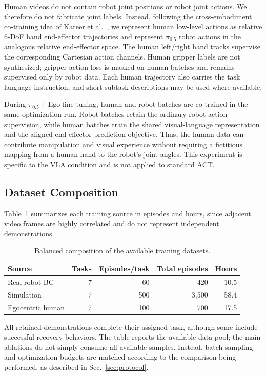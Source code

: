 \documentclass[10pt,conference]{IEEEtran}
\begin{document}
Human videos do not contain robot joint positions or robot joint actions. We
therefore do not fabricate joint labels. Instead, following the cross-embodiment
co-training idea of Kareer et al.~\cite{kareer2025humanrobot}, we represent
human low-level actions as relative 6-DoF hand end-effector trajectories and
represent $\pi_{0.5}$ robot actions in the analogous relative end-effector
space. The human left/right hand tracks supervise the corresponding Cartesian
action channels. Human gripper labels are not synthesized; gripper-action loss
is masked on human batches and remains supervised only by robot data. Each
human trajectory also carries the task language instruction, and short subtask
descriptions may be used where available.

During $\pi_{0.5}+\mathrm{Ego}$ fine-tuning, human and robot batches are
co-trained in the same optimization run. Robot batches retain the ordinary
robot action supervision, while human batches train the shared visual-language
representation and the aligned end-effector prediction objective. Thus, the
human data can contribute manipulation and visual experience without requiring
a fictitious mapping from a human hand to the robot's joint angles. This experiment
is specific to the VLA condition and is not applied to standard ACT.

\subsection{Dataset Composition}

Table~\ref{tab:data} summarizes each training source in episodes and hours,
since adjacent video frames are highly correlated and do not represent
independent demonstrations.

\begin{table}[t]
\centering
\small
\caption{Balanced composition of the available training datasets.}
\label{tab:data}
\begin{tabular}{@{}lrrrr@{}}
\toprule
Source & Tasks & Episodes/task & Total episodes & Hours \\
\midrule
Real-robot BC    & 7 & 60  & 420   & 10.5 \\
Simulation       & 7 & 500 & 3,500 & 58.4 \\
Egocentric human & 7 & 100 & 700   & 17.5 \\
\bottomrule
\end{tabular}
\end{table}

All retained demonstrations complete their assigned task, although some include
successful recovery behaviors. The table reports the available data pool; the
main ablations do not simply consume all available samples. Instead, batch
sampling and optimization budgets are matched according to the comparison being
performed, as described in Sec.~\ref{sec:protocol}.
\end{document}
